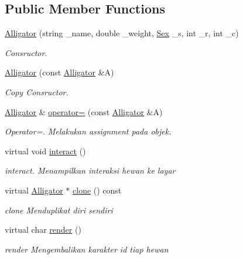 \subsection*{Public Member Functions}
\begin{DoxyCompactItemize}
\item 
\hyperlink{classAlligator_a394c31cac732c8e80210eb1a08d9be90}{Alligator} (string \+\_\+name, double \+\_\+weight, \hyperlink{sex_8h_a2633cb393c68bb2ee8080db58fb7ba93}{Sex} \+\_\+s, int \+\_\+r, int \+\_\+c)
\begin{DoxyCompactList}\small\item\em Consructor. \end{DoxyCompactList}\item 
\hyperlink{classAlligator_a238834ce335e366454e4720e20471855}{Alligator} (const \hyperlink{classAlligator}{Alligator} \&A)
\begin{DoxyCompactList}\small\item\em Copy Consructor. \end{DoxyCompactList}\item 
\hyperlink{classAlligator}{Alligator} \& \hyperlink{classAlligator_ad264fccaab105b186b2a4dd38e6bb896}{operator=} (const \hyperlink{classAlligator}{Alligator} \&A)
\begin{DoxyCompactList}\small\item\em Operator=. Melakukan assignment pada objek. \end{DoxyCompactList}\item 
virtual void \hyperlink{classAlligator_adad51497aab15fa3ed6cb00bc08ee546}{interact} ()
\begin{DoxyCompactList}\small\item\em interact. Menampilkan interaksi hewan ke layar \end{DoxyCompactList}\item 
virtual \hyperlink{classAlligator}{Alligator} $\ast$ \hyperlink{classAlligator_a307ef9ed05cad69f34b0aa19bc4a4914}{clone} () const 
\begin{DoxyCompactList}\small\item\em clone Menduplikat diri sendiri \end{DoxyCompactList}\item 
virtual char \hyperlink{classAlligator_acc0c14bd7f158137577d158d774efe75}{render} ()
\begin{DoxyCompactList}\small\item\em render Mengembalikan karakter id tiap hewan \end{DoxyCompactList}\item 

\end{DoxyCompactItemize}
